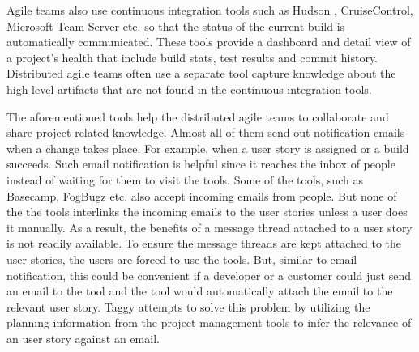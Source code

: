 Agile teams also use continuous integration tools such as Hudson \cite{Hudson}, CruiseControl\cite{cruise_control}, Microsoft Team Server\cite{team_server} etc. so that the status of the current build is automatically communicated. These tools provide a dashboard and detail view of a project's health that include build stats, test results and commit history. Distributed agile teams often use a separate tool capture knowledge about the high level artifacts that are not found in the continuous integration tools.

The aforementioned tools help the distributed agile teams to collaborate and share project related knowledge. Almost all of them send out notification emails when a change takes place. For example, when a user story is assigned or a build succeeds. Such email notification is helpful since it reaches the inbox of people instead of waiting for them to visit the tools. Some of the tools, such as Basecamp, FogBugz etc. also accept incoming emails from people. But none of the the tools interlinks the incoming emails to the user stories unless a user does it manually. As a result, the benefits of a message thread attached to a user story is not readily available. To ensure the message threads are kept attached to the user stories, the users are forced to use the tools. But, similar to email notification, this could be convenient if a developer or a customer could just send an email to the tool and the tool would automatically attach the email to the relevant user story. Taggy attempts to solve this problem by utilizing the planning information from the project management tools to infer the relevance of an user story against an email.